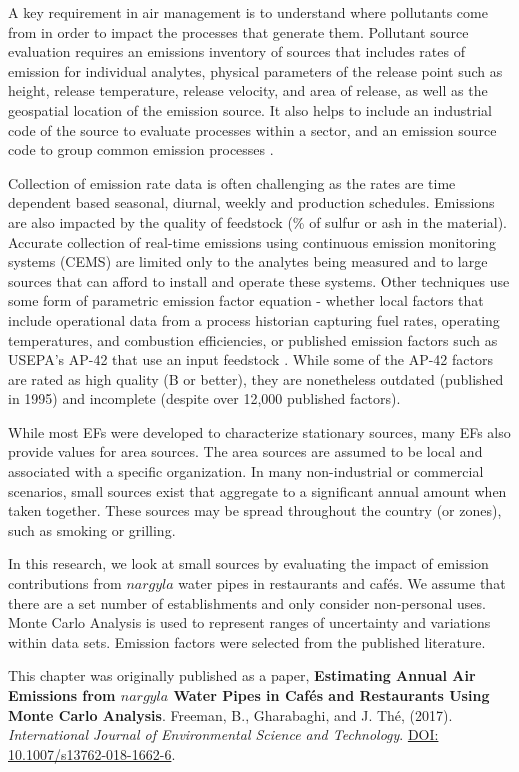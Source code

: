 A key requirement in air management is to understand where pollutants come from in order to impact the processes that generate them. Pollutant source evaluation requires an emissions inventory of sources that includes rates of emission for individual analytes, physical parameters of the release point such as height, release temperature, release velocity, and area of release, as well as the geospatial location of the emission source. It also helps to include an industrial code of the source to evaluate processes within a sector, and an emission source code to group common emission processes \citep{The2008}.

Collection of emission rate data is often challenging as the rates are time dependent based seasonal, diurnal, weekly and production schedules. Emissions are also impacted by the quality of feedstock (\% of sulfur or ash in the material). Accurate collection of real-time emissions using continuous emission monitoring systems (CEMS) are limited only to the analytes being measured and to large sources that can afford to install and operate these systems. Other techniques use some form of parametric emission factor equation - whether local factors that include operational data from a process historian capturing fuel rates, operating temperatures, and combustion efficiencies, or published emission factors such as USEPA's AP-42 that use an input feedstock \citep{USEPA1995}. While some of the AP-42 factors are rated as high quality (B or better), they are nonetheless outdated (published in 1995) and incomplete (despite over 12,000 published factors).

While most EFs were developed to characterize stationary sources, many EFs also provide values for area sources. The area sources are assumed to be local and associated with a specific organization. In many non-industrial or commercial scenarios, small sources exist that aggregate to a significant annual amount when taken together.  These sources may be spread throughout the country (or zones), such as smoking or grilling.

In this research, we look at small sources by evaluating the impact of emission contributions from $nargyla$ water pipes in restaurants and caf\'es. We assume that there are a set number of establishments and only consider non-personal uses.  Monte Carlo Analysis is used to represent ranges of uncertainty and variations within data sets. Emission factors were selected from the published literature.

This chapter was originally published as a paper,  \textbf{Estimating Annual Air Emissions from $nargyla$ Water Pipes in Caf\'es and Restaurants Using Monte Carlo Analysis}. Freeman, B., Gharabaghi, and J.  Th\'e, (2017). \textit{International Journal of Environmental Science and Technology}. \url{DOI: 10.1007/s13762-018-1662-6}.


